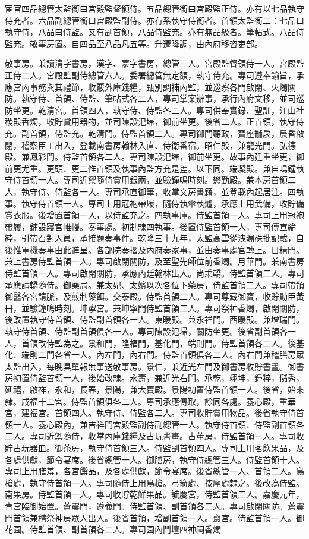 \begin{pinyinscope}
宦官四品總管太監銜曰宮殿監督領侍。五品總管銜曰宮殿監正侍。亦有以七品執守侍充者。六品副總管銜曰宮殿監副侍。亦有系執守侍銜者。首領太監銜二：七品曰執守侍，八品曰侍監。又有副首領，八品侍監充。亦有無品級者。筆帖式。八品侍監充。敬事房置。自四品至八品凡五等。升遷降調，由內府移咨吏部。

敬事房。兼讀清字書房，漢字、蒙字書房，總管三人。宮殿監督領侍一人。宮殿監正侍二人。宮殿監副侍總管六人。委署總管無定額，執守侍充。專司遵奉諭旨，承應宮內事務與其禮節，收覈外庫錢糧，甄別調補內監，並巡察各門啟閉、火燭關防。執守侍、首領、侍監、筆帖式各二人，專司掌案辦事，承行內府文移，並司巡防坐更。乾清宮。首領四人，執守侍、侍監各二人。專司供奉實錄、聖訓，江山社稷殿香燭，收貯賞用器物，並司陳設氾埽，御前坐更。後省二人。正首領，執守侍充。副首領，侍監充。乾清門。侍監首領二人。專司御門聽政，寶座黼扆，晨昏啟閉，稽察臣工出入，登載南書房翰林入直、侍衛番宿。昭仁殿，兼龍光門。弘德殿。兼鳳彩門。侍監首領各二人。專司陳設氾埽，御前坐更。故事內廷重坐更，御前更尤重。更頭、更二惟首領及執事內監方充是差。以下同。端凝殿。兼自鳴鐘執守侍首領一人。專司近禦隨侍賞用銀兩，並驗鐘鳴時刻。懋勤殿。兼本房首領二人，執守侍、侍監各一人。專司承直御筆，收掌文房書籍，並登載內起居注。四執事。執守侍首領一人。專司上用冠袍帶履，隨侍執傘執爐，承應上用武備，收貯備賞衣服。後增置首領一人，以侍監充之。四執事庫。侍監首領一人。專司上用冠袍帶履，鋪設寢宮帷幔。奏事處。初制隸四執事。後置侍監首領一人，專司傳宣綸綍，引帶召對人員，承接題奏事件。乾隆三十九年，太監高雲從洩漏硃批記載，自後惟軍機奏事由此進呈。各部院奏摺及內府奏家事，並由奏事處官轉上。日精門。兼上書房侍監首領一人。專司啟閉關防，及至聖先師位前香燭。月華門。兼南書房侍監首領一人。專司啟閉關防，承應內廷翰林出入。尚乘轎。侍監首領二人。專司承應請轎隨侍。御藥局。兼太妃、太嬪以次各位下藥房，侍監首領二人。專司帶領御醫各宮請脈，及煎制藥餌。交泰殿。侍監首領二人。專司尊藏御寶，收貯勛臣黃冊，並驗鐘鳴時刻。坤寧宮。兼坤寧門侍監首領二人。專司祭神香燭，啟閉關防，後改置執守侍首領、侍監副首領各一人。東暖殿。兼永祥門。西暖殿。兼增瑞門。執守侍首領、侍監副首領俱各一人。專司陳設氾埽，關防坐更。後省副首領各一人，首領改侍監為之。景和門，隆福門，基化門，端則門。侍監首領各二人。後基化、端則二門各省一人。內左門，內右門。侍監首領俱各二人。內右門兼稽膳房眾太監出入，每晚具單報無事送敬事房。景仁，兼近光左門及御書房收貯書畫。御書房初置侍監首領一人，後始改隸。永壽，兼近光右門。承乾，翊坤，鍾粹，儲秀，延禧，啟祥，永和，長春，景陽，兼大寶殿。景陽初置侍監首領一人。後省，始來隸。咸福十二宮。侍監首領俱各二人。專司承應傳取，餘同各處。養心殿，重華宮，建福宮。首領四人。執守侍、侍監各二人。專司收貯賞用物品。後省執守侍首領一人。養心殿內，兼吉祥門宮殿監副侍副總管一人。執守侍首領、侍監副首領各二人。專司近禦隨侍，收掌內庫錢糧及古玩書畫。古董房，侍監首領一人。專司收貯古玩器皿。御茶房，執守侍首領三人。侍監副首領四人。專司上用茗飲果品，及各處供獻，節令宴席。後省總管一人。御膳房，執守侍總管三人。侍監首領十人。專司上用膳羞，各宮饌品，及各處供獻，節令宴席。後省總管一人、首領二人。鳥槍處，執守侍首領一人。專司隨侍上用鳥槍。弓箭處、按摩處隸之。後改為侍監。南果房。侍監首領一人。專司收貯乾鮮果品。毓慶宮，侍監首領二人。嘉慶元年，青宮臨御始置。蒼震門，遵義門。侍監首領、副首領各二人。專司啟閉關防。蒼震門首領兼稽祭神房眾人出入。後省首領，增副首領一人。齋宮。侍監首領一人。御花園。侍監首領、副首領各二人。專司園內鬥壇四神祠香燭
\end{pinyinscope}
